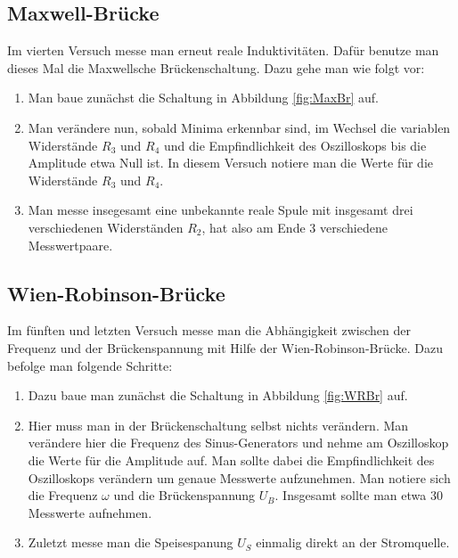 \subsection{Maxwell-Brücke}
\label{sec:D4}

Im vierten Versuch messe man erneut reale Induktivitäten. Dafür benutze man
dieses Mal die Maxwellsche Brückenschaltung. Dazu gehe man wie folgt vor:

\begin{enumerate}

\item Man baue zunächst die Schaltung in Abbildung \ref{fig:MaxBr} auf.

\item Man verändere nun, sobald Minima erkennbar sind, im Wechsel die variablen
Widerstände $R_3$ und $R_4$ und die Empfindlichkeit des Oszilloskops
bis die Amplitude etwa Null ist. In diesem Versuch notiere man die Werte
für die Widerstände $R_3$ und $R_4$.

\item Man messe insegesamt eine unbekannte reale Spule mit
insgesamt drei verschiedenen Widerständen $R_2$, hat also am Ende 3
verschiedene Messwertpaare.

\end{enumerate}

\subsection{Wien-Robinson-Brücke}

Im fünften und letzten Versuch messe man die Abhängigkeit zwischen der
Frequenz und der Brückenspannung mit Hilfe der Wien-Robinson-Brücke.
Dazu befolge man folgende Schritte:

\begin{enumerate}

\item Dazu baue man zunächst die Schaltung in Abbildung \ref{fig:WRBr} auf.

\item Hier muss man in der Brückenschaltung selbst nichts verändern. Man
verändere hier die Frequenz des Sinus-Generators und nehme am Oszilloskop
die Werte für die Amplitude auf. Man sollte dabei die Empfindlichkeit des
Oszilloskops verändern um genaue Messwerte aufzunehmen. Man notiere sich
die Frequenz $\omega$ und die Brückenspannung $U_B$. Insgesamt sollte man
etwa 30 Messwerte aufnehmen.

\item Zuletzt messe man die Speisespanung $U_S$ einmalig direkt an der
Stromquelle.

\end{enumerate}
